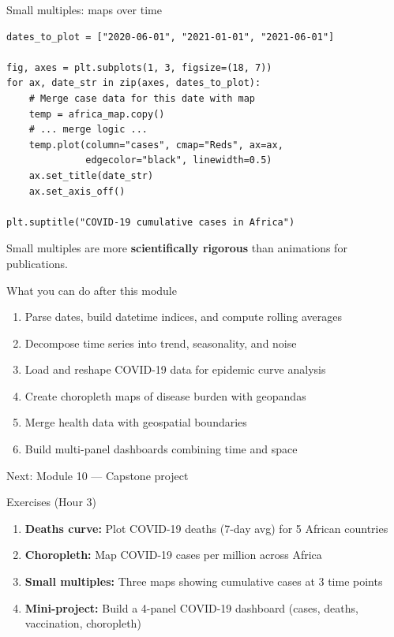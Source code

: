 \documentclass[aspectratio=169,11pt]{beamer}
\begin{document}
\begin{frame}[fragile]{Small multiples: maps over time}
\begin{verbatim}
dates_to_plot = ["2020-06-01", "2021-01-01", "2021-06-01"]

fig, axes = plt.subplots(1, 3, figsize=(18, 7))
for ax, date_str in zip(axes, dates_to_plot):
    # Merge case data for this date with map
    temp = africa_map.copy()
    # ... merge logic ...
    temp.plot(column="cases", cmap="Reds", ax=ax,
              edgecolor="black", linewidth=0.5)
    ax.set_title(date_str)
    ax.set_axis_off()

plt.suptitle("COVID-19 cumulative cases in Africa")
\end{verbatim}

Small multiples are more \textbf{scientifically rigorous} than animations for publications.
\end{frame}

\begin{frame}{What you can do after this module}
\begin{enumerate}
  \item Parse dates, build datetime indices, and compute rolling averages
  \item Decompose time series into trend, seasonality, and noise
  \item Load and reshape COVID-19 data for epidemic curve analysis
  \item Create choropleth maps of disease burden with geopandas
  \item Merge health data with geospatial boundaries
  \item Build multi-panel dashboards combining time and space
\end{enumerate}

\vspace{12pt}
\centering
\Large \alert{Next: Module 10 --- Capstone project}
\end{frame}

\begin{frame}{Exercises (Hour 3)}
\begin{enumerate}
  \item \textbf{Deaths curve:} Plot COVID-19 deaths (7-day avg) for 5 African countries
  \item \textbf{Choropleth:} Map COVID-19 cases per million across Africa
  \item \textbf{Small multiples:} Three maps showing cumulative cases at 3 time points
  \item \textbf{Mini-project:} Build a 4-panel COVID-19 dashboard (cases, deaths, vaccination, choropleth)
\end{enumerate}
\end{frame}
\end{document}
